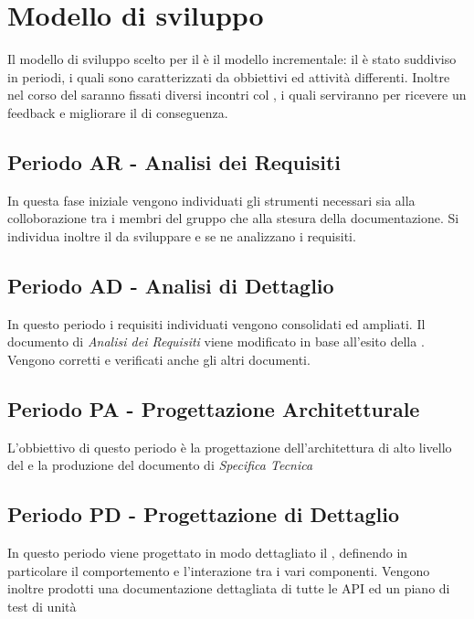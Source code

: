 \documentclass[./PianoDiProgetto.tex]{subfiles}
\begin{document}
  \section{Modello di sviluppo}

  Il modello di sviluppo scelto per il  è il modello incrementale: il
   è stato suddiviso in periodi, i quali sono caratterizzati da
  obbiettivi ed attività differenti. Inoltre nel corso del  saranno
  fissati diversi incontri col , i quali serviranno per ricevere un
  feedback e migliorare il  di conseguenza.

  \subsection{Periodo AR - Analisi dei Requisiti}

  In questa fase iniziale vengono individuati gli strumenti necessari sia alla
  colloborazione tra i membri del gruppo che alla stesura della documentazione.
  Si individua inoltre il  da sviluppare e se ne analizzano i requisiti.

  \subsection{Periodo AD - Analisi di Dettaglio}

  In questo periodo i requisiti individuati vengono consolidati ed ampliati. Il
  documento di \textit{Analisi dei Requisiti} viene modificato in base all'esito
  della \RR. Vengono corretti e verificati anche gli altri documenti.

  \subsection{Periodo PA - Progettazione Architetturale}

  L'obbiettivo di questo periodo è la progettazione dell'architettura di alto
  livello del  e la produzione del documento di \textit{Specifica Tecnica}

  \subsection{Periodo PD - Progettazione di Dettaglio}

  In questo periodo viene progettato in modo dettagliato il , definendo
  in particolare il comportemento e l'interazione tra i vari componenti. Vengono
  inoltre prodotti una documentazione dettagliata di tutte le API ed un piano
  di test di unità
\end{document}
